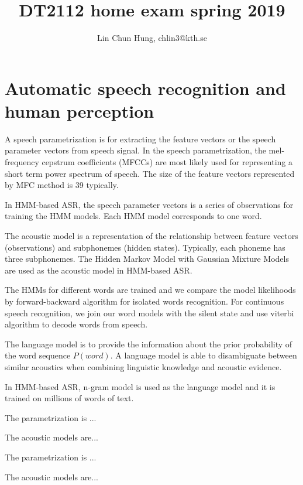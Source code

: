 \documentclass[12pt]{article}
\newenvironment{problem}[2][Problem]{\begin{trivlist}
\item[\hskip \labelsep {\bfseries #1}\hskip \labelsep {\bfseries #2.}]}{\end{trivlist}}
\begin{document}
\title{DT2112 home exam spring 2019}
\author{Lin Chun Hung, chlin3@kth.se}
\maketitle

\section{Automatic speech recognition and human perception}
\begin{problem}{1.1}
    A speech parametrization is for extracting the feature vectors or 
    the speech parameter vectors from speech signal. In the speech parametrization,
    the mel-frequency cepstrum coefficients (MFCCs) are most likely used for
    representing a short term power spectrum of speech. The size of the 
    feature vectors represented by MFC method is 39 typically. 

    In HMM-based ASR, the speech parameter vectors is a series of observations
    for training the HMM models. Each HMM model corresponds to one word.
    
    The acoustic model is a representation of the relationship between feature 
    vectors (observations) and subphonemes (hidden states).
    Typically, each phoneme has three subphonemes. The Hidden Markov Model with 
    Gaussian Mixture Models are used as the acoustic model in HMM-based ASR.

    The HMMs for different words are trained and we compare the model likelihoods
    by forward-backward algorithm for isolated words recognition. For continuous
    speech recognition, we join our word models with the silent state and use viterbi 
    algorithm to decode words from speech.

    The language model is to provide the information about the prior probability
    of the word sequence $P(word)$. A language model is able to disambiguate between
    similar acoustics when combining linguistic knowledge and acoustic evidence.
    
    In HMM-based ASR, n-gram model is used as the language model and it is trained
    on millions of words of text.
\end{problem}


\begin{problem}{1.2}
    The parametrization is ...
    
    The acoustic models are...
\end{problem}

\begin{problem}{1.3}
    The parametrization is ...

    The acoustic models are...
\end{problem}
\end{document}
